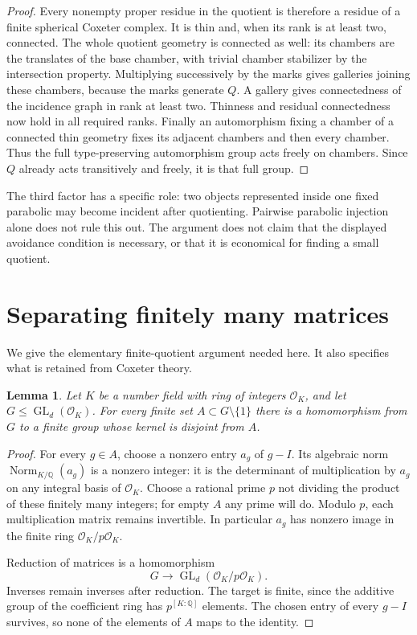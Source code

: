 \documentclass[11pt,a4paper]{article}
\newtheorem{lemma}[theorem]{Lemma}
\begin{document}
\begin{proof}
Every nonempty proper residue in the quotient is therefore a residue
of a finite spherical Coxeter complex. It is thin and, when its rank
is at least two, connected. The whole quotient geometry is connected
as well: its chambers are the translates of the base chamber, with
trivial chamber stabilizer by the intersection property. Multiplying
successively by the marks gives galleries joining these chambers,
because the marks generate $Q$. A gallery gives connectedness of
the incidence graph in rank at least two. Thinness and residual
connectedness now hold in all required ranks. Finally an
automorphism fixing a chamber of a connected thin geometry fixes
its adjacent chambers and then every chamber. Thus the full
type-preserving automorphism group acts freely on chambers. Since
$Q$ already acts transitively and freely, it is that full group.
\end{proof}

The third factor has a specific role: two objects represented inside
one fixed parabolic may become incident after quotienting. Pairwise
parabolic injection alone does not rule this out. The argument does
not claim that the displayed avoidance condition is necessary, or
that it is economical for finding a small quotient.

\section{Separating finitely many matrices}

We give the elementary finite-quotient argument needed here. It also
specifies what is retained from Coxeter theory.

\begin{lemma}\label{matrices}
Let $K$ be a number field with ring of integers $\mathcal O_K$,
and let $G\le\operatorname{GL}_d(\mathcal O_K)$. For every finite
set $A\subset G\setminus\{1\}$ there is a homomorphism from $G$
to a finite group whose kernel is disjoint from $A$.
\end{lemma}

\begin{proof}
For every $g\in A$, choose a nonzero entry $a_g$ of $g-I$.
Its algebraic norm $\operatorname{Norm}_{K/\mathbb Q}(a_g)$ is a
nonzero integer: it is the determinant of multiplication by $a_g$
on any integral basis of $\mathcal O_K$. Choose a rational prime
$p$ not dividing the product of these finitely many integers; for
empty $A$ any prime will do. Modulo $p$, each multiplication
matrix remains invertible. In particular $a_g$ has nonzero image
in the finite ring $\mathcal O_K/p\mathcal O_K$.

Reduction of matrices is a homomorphism
\[
 G\longrightarrow
 \operatorname{GL}_d(\mathcal O_K/p\mathcal O_K).
\]
Inverses remain inverses after reduction. The target is finite,
since the additive group of the coefficient ring has
$p^{[K:\mathbb Q]}$ elements. The chosen entry of every $g-I$
survives, so none of the elements of $A$ maps to the identity.
\end{proof}
\end{document}
